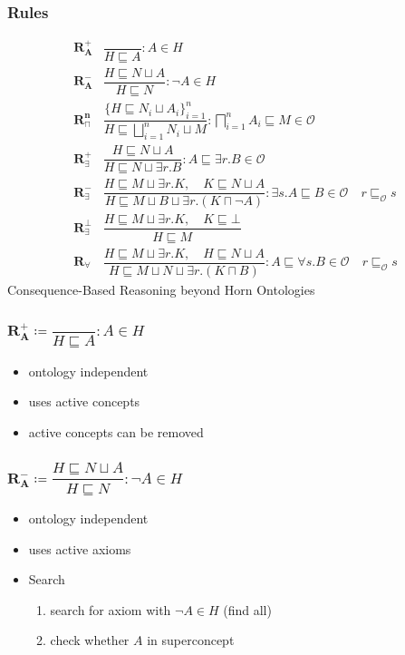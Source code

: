 \documentclass{beamer}
\begin{document}
\begin{frame}
\frametitle{Rules}
{\small
\begin{align}
    \mathbf{R^{+}_A} & \dfrac{}{H\sqsubseteq A} : A \in H \label{rules:RPlusA}\\
    \mathbf{R^{-}_A} & \dfrac{H \sqsubseteq N \sqcup A}{H \sqsubseteq N} : \neg A \in H  \label{rules:RMinusA}\\ 
    \mathbf{R^{n}_{\sqcap}} & \dfrac{\{H \sqsubseteq N_i \sqcup A_i \}^{n}_{i=1}}{H \sqsubseteq \bigsqcup^{n}_{i=1} N_i \sqcup M} : \bigsqcap^{n}_{i=1} A_i \sqsubseteq M \in \mathcal{O} \label{rules:RNAnd} \\
    \mathbf{R^+_{\exists}} & \dfrac{H \sqsubseteq N \sqcup A }{ H \sqsubseteq N \sqcup \exists r.B} : A \sqsubseteq \exists r.B \in \mathcal{O} \label{rules:RPlusExists}\\
    \mathbf{R^-_{\exists}} & \dfrac{H \sqsubseteq M \sqcup \exists r.K,\quad K \sqsubseteq N \sqcup A}{H \sqsubseteq M \sqcup B \sqcup \exists r.(K \sqcap \neg A)} : \exists s.A \sqsubseteq B \in \mathcal{O} \quad r \sqsubseteq_{\mathcal{O}} s \label{rules:RMinusExists}\\
    \mathbf{R^\bot_{\exists}} & \dfrac{H \sqsubseteq M \sqcup \exists r.K,\quad K \sqsubseteq \bot}{H \sqsubseteq M} \label{rules:RBotExists}\\
    \mathbf{R_{\forall}} & \dfrac{H \sqsubseteq M \sqcup \exists r.K,\quad H \sqsubseteq N \sqcup A}{H \sqsubseteq M \sqcup N \sqcup \exists r.(K \sqcap B)} : A \sqsubseteq \forall s.B \in \mathcal{O} \quad r \sqsubseteq_{\mathcal{O}} s \label{rules:RForall}
  \end{align}
}
{\tiny Consequence-Based Reasoning beyond Horn Ontologies \cite{10.5555/2283516.2283580}}

\end{frame}

\begin{frame}
\frametitle{$\mathbf{R^{+}_A} \coloneq \dfrac{}{H\sqsubseteq A} : A \in H$}
\begin{itemize}
    \item ontology independent
    \item uses active concepts
    \item active concepts can be removed
\end{itemize}
\end{frame}

\begin{frame}
    \frametitle{$\mathbf{R^{-}_A} \coloneq \dfrac{H \sqsubseteq N \sqcup A}{H \sqsubseteq N} : \neg A \in H$}
    \begin{itemize}
        \item ontology independent
        \item uses active axioms
        \item Search
        \begin{enumerate}
            \item search for axiom with $\neg A \in H$ (find all)
            \item check whether $A$ in superconcept 
        \end{enumerate}
    \end{itemize}
\end{frame}
\end{document}
